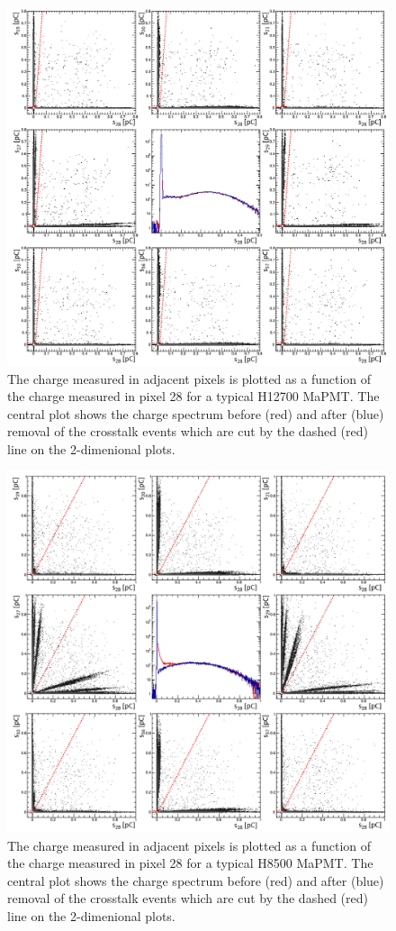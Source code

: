 \begin{figure}
	\centering
	\includegraphics[width=0.95\linewidth]{figures/H12700_ct.png}
	\caption{The charge measured in adjacent pixels is plotted as a function of the charge measured in pixel 28 for a typical H12700 MaPMT. The central plot shows the charge spectrum before (red) and after (blue) removal of the crosstalk events which are cut by the dashed (red) line on the 2-dimenional plots.}
	\label{fig:H12700neighbors}
\end{figure}
\begin{figure}
	\includegraphics[width=0.95\linewidth]{figures/H8500_ct.png}
	\caption{The charge measured in adjacent pixels is plotted as a function of the charge measured in pixel 28 for a typical H8500 MaPMT. The central plot shows the charge spectrum before (red) and after (blue) removal of the crosstalk events which are cut by the dashed (red) line on the 2-dimenional plots.}
	\label{fig:H8500neighbors}
\end{figure}


